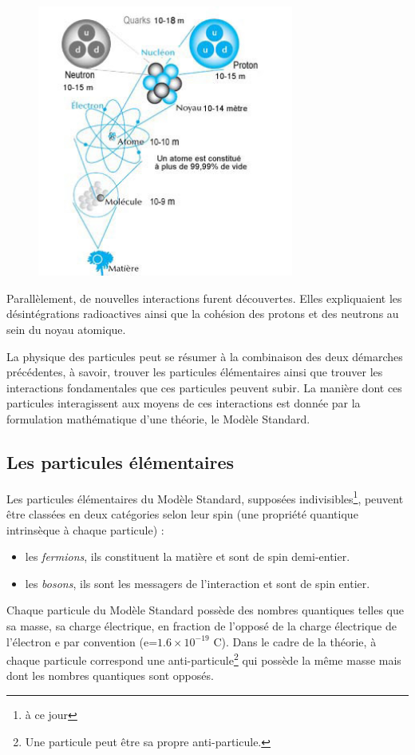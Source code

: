 \begin{figure}[h!]
\centering
\includegraphics[width=0.75\textwidth]{SM/structure.jpg}
\label{structure}
\end{figure}

Parallèlement, de nouvelles interactions furent découvertes. Elles expliquaient les désintégrations radioactives ainsi que la cohésion des protons et des neutrons au sein du noyau atomique.

La physique des particules peut se résumer à la combinaison des deux démarches précédentes, à savoir, trouver les particules élémentaires ainsi que trouver les interactions fondamentales que ces particules peuvent subir. La manière dont ces particules interagissent aux moyens de ces interactions est donnée par la formulation mathématique d'une théorie, le Modèle Standard.

\subsection{Les particules élémentaires}
Les particules élémentaires du Modèle Standard, supposées indivisibles\footnote{à ce jour}, peuvent être classées en deux catégories selon leur spin (une propriété quantique intrinsèque à chaque particule) :
\begin{itemize}[label=$\bullet$]
\item les \textit{fermions}, ils constituent la matière et sont de spin demi-entier.
\item les \textit{bosons}, ils sont les messagers de l'interaction et sont de spin entier.
\end{itemize}
Chaque particule du Modèle Standard possède des nombres quantiques telles que sa masse, sa charge électrique, en fraction de l'opposé de la charge électrique de l'électron e par convention (e=$1.6\times10^{-19}$ C). Dans le cadre de la théorie, à chaque particule correspond une anti-particule\footnote{Une particule peut être sa propre anti-particule.} qui possède la même masse mais dont les nombres quantiques sont opposés.

